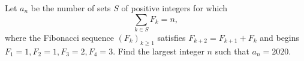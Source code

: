 Let $a_n$ be the number of sets $S$ of positive integers for which
\[
\sum_{k \in S} F_k = n,
\]
where the Fibonacci sequence $(F_k)_{k \geq 1}$ satisfies $F_{k+2} = F_{k+1} + F_k$ and begins $F_1 = 1, F_2 = 1, F_3 = 2, F_4 = 3$. Find the largest integer $n$ such that $a_n = 2020$.
